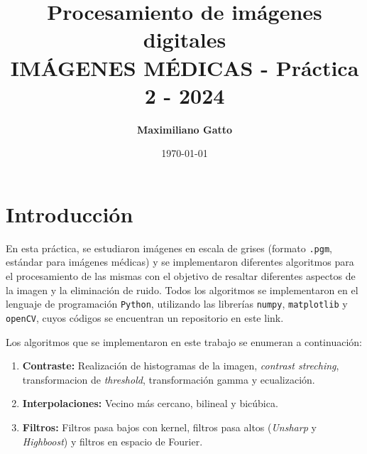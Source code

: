 \documentclass[11pt, twocolumn]{article}
\title{\textbf{Procesamiento de imágenes digitales} \\ \vspace{1cm} \large IMÁGENES MÉDICAS - Práctica 2 - 2024}
\author[ ]{\textbf{Maximiliano Gatto}}
\affil[ ]{Instituto Balseiro (UNCuyo - CNEA) - Bariloche, Río Negro, Argentina\vspace{0.4cm}}
\affil[ ]{\href{mailto:maximiliano.gatto@ib.edu.ar}{maximiliano.gatto@ib.edu.ar}}
\date{\today}
\begin{document}
\maketitle

\section{Introducción}



En esta práctica, se estudiaron imágenes en escala de grises (formato \texttt{.pgm}, estándar para imágenes médicas) y se implementaron diferentes algoritmos para el procesamiento de las mismas con el objetivo de resaltar diferentes aspectos de la imagen y la eliminación de ruido. Todos los algoritmos se implementaron en el lenguaje de programación \texttt{Python}, utilizando las librerías \texttt{numpy}, \texttt{matplotlib} y \texttt{openCV}, cuyos códigos se encuentran un repositorio en este link.

Los algoritmos que se implementaron en este trabajo se enumeran a continuación:

\begin{enumerate}
  \item \textbf{Contraste:} Realización de histogramas de la imagen, \textit{contrast streching}, transformacion de \textit{threshold}, transformación gamma y ecualización.
  \item \textbf{Interpolaciones:} Vecino más cercano, bilineal y bicúbica.
  \item \textbf{Filtros:} Filtros pasa bajos con kernel, filtros pasa altos (\textit{Unsharp} y \textit{Highboost}) y filtros en espacio de Fourier.
  
\end{enumerate}
\end{document}
